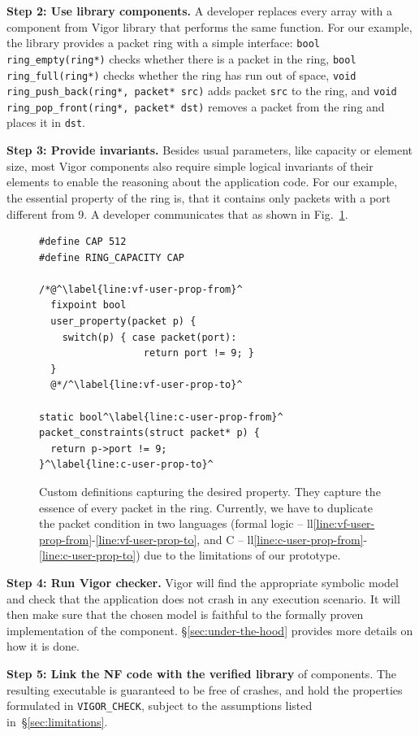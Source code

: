 \documentclass[letterpaper,twocolumn,10pt]{article}
\newcommand{\code}[1]{\lstinline{#1}}
\begin{document}
{\bf Step 2: Use library components. } A developer replaces every array with a
component from Vigor library that performs the same function. For our example,
the library provides a packet ring with a simple interface: \code{bool
  ring_empty(ring*)} checks whether there is a packet in the ring, \code{bool
  ring_full(ring*)} checks whether the ring has run out of space, \code{void
  ring_push_back(ring*, packet* src)} adds packet \code{src} to the ring, and
\code{void ring_pop_front(ring*, packet* dst)} removes a packet from the ring
and places it in \code{dst}.


{\bf Step 3: Provide invariants.} Besides usual parameters, like capacity or
element size, most Vigor components also require simple logical invariants of
their elements to enable the reasoning about the application code. For our
example, the essential property of the ring is, that it contains only packets
with a port different from 9. A developer communicates that as shown in
Fig.~\ref{lst:customizations}.

\begin{figure}
\begin{lstlisting}
#define CAP 512
#define RING_CAPACITY CAP

/*@^\label{line:vf-user-prop-from}^
  fixpoint bool
  user_property(packet p) {
    switch(p) { case packet(port):
                  return port != 9; }
  }
  @*/^\label{line:vf-user-prop-to}^

static bool^\label{line:c-user-prop-from}^
packet_constraints(struct packet* p) {
  return p->port != 9;
}^\label{line:c-user-prop-to}^
\end{lstlisting}
  \caption{Custom definitions capturing the desired property. They capture the
    essence of every packet in the ring. Currently, we have to duplicate the
    packet condition in two languages (formal logic --
    ll\ref{line:vf-user-prop-from}-\ref{line:vf-user-prop-to}, and C --
    ll\ref{line:c-user-prop-from}-\ref{line:c-user-prop-to}) due to the
    limitations of our prototype.}
  \label{lst:customizations}
\end{figure}


{\bf Step 4: Run Vigor checker.} Vigor will find the appropriate symbolic model
and check that the application does not crash in any execution scenario. It will
then make sure that the chosen model is faithful to the formally proven
implementation of the component. \S\ref{sec:under-the-hood} provides more
details on how it is done.

{\bf Step 5: Link the NF code with the verified library} of components. The
resulting executable is guaranteed to be free of crashes, and hold the
properties formulated in \code{VIGOR_CHECK}, subject to the assumptions listed
in~\S\ref{sec:limitations}.
\end{document}
